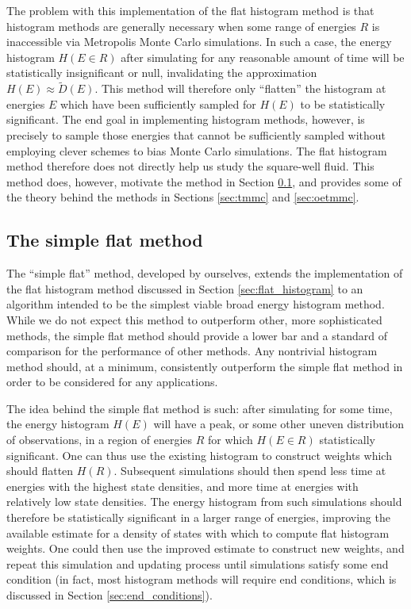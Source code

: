 \documentclass[11pt]{article}
\newcommand{\p}[1]{\left(#1\right)} %
\begin{document}
The problem with this implementation of the flat histogram method is
that histogram methods are generally necessary when some range of
energies $R$ is inaccessible via Metropolis Monte Carlo
simulations. In such a case, the energy histogram $H\p{E\in R}$ after
simulating for any reasonable amount of time will be statistically
insignificant or null, invalidating the approximation
$H\p{E}\approx\tilde D\p{E}$. This method will therefore only
``flatten'' the histogram at energies $E$ which have been sufficiently
sampled for $H\p{E}$ to be statistically significant. The end goal in
implementing histogram methods, however, is precisely to sample those
energies that cannot be sufficiently sampled without employing clever
schemes to bias Monte Carlo simulations. The flat histogram method
therefore does not directly help us study the square-well fluid. This
method does, however, motivate the method in Section
\ref{sec:simple_flat}, and provides some of the theory behind the
methods in Sections \ref{sec:tmmc} and \ref{sec:oetmmc}.

\subsection{The simple flat method}
\label{sec:simple_flat}

The ``simple flat'' method, developed by ourselves, extends the
implementation of the flat histogram method discussed in Section
\ref{sec:flat_histogram} to an algorithm intended to be the simplest
viable broad energy histogram method. While we do not expect this
method to outperform other, more sophisticated methods, the simple
flat method should provide a lower bar and a standard of comparison
for the performance of other methods. Any nontrivial histogram method
should, at a minimum, consistently outperform the simple flat method
in order to be considered for any applications.

The idea behind the simple flat method is such: after simulating for
some time, the energy histogram $H\p{E}$ will have a peak, or some
other uneven distribution of observations, in a region of energies $R$
for which $H\p{E\in R}$ statistically significant. One can thus use
the existing histogram to construct weights which should flatten
$H\p{R}$. Subsequent simulations should then spend less time at
energies with the highest state densities, and more time at energies
with relatively low state densities. The energy histogram from such
simulations should therefore be statistically significant in a larger
range of energies, improving the available estimate for a density of
states with which to compute flat histogram weights. One could then
use the improved estimate to construct new weights, and repeat this
simulation and updating process until simulations satisfy some end
condition (in fact, most histogram methods will require end
conditions, which is discussed in Section \ref{sec:end_conditions}).
\end{document}
